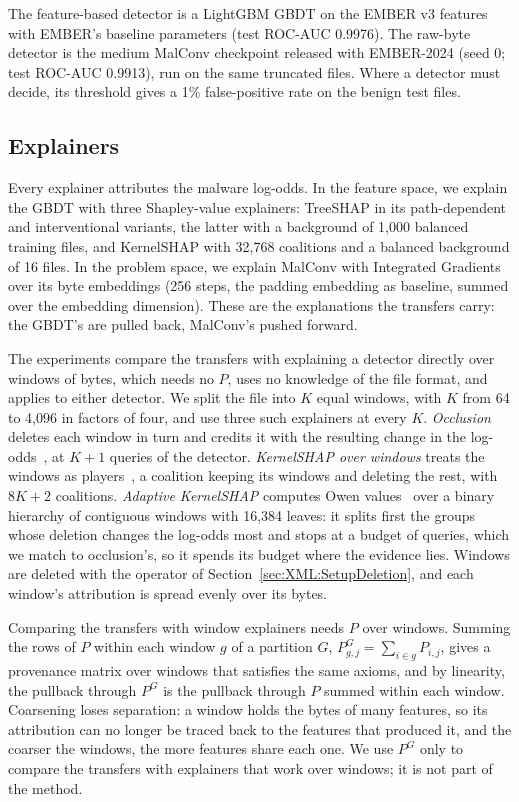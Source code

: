 The feature-based detector is a LightGBM GBDT on the EMBER v3 features with EMBER's baseline parameters (test ROC-AUC
0.9976). The raw-byte detector is the medium MalConv checkpoint released with EMBER-2024 (seed 0; test ROC-AUC 0.9913),
run on the same truncated files. Where a detector must decide, its threshold gives a 1\% false-positive rate on the
benign test files.

\subsection{Explainers}
\label{sec:XML:SetupExplainers}
\label{sec:XML:SetupWindows}

Every explainer attributes the malware log-odds. In the feature space, we explain the GBDT with three Shapley-value
explainers: TreeSHAP in its path-dependent and interventional variants, the latter with a background of 1{,}000
balanced training files, and KernelSHAP with 32{,}768 coalitions and a balanced background of 16 files. In the problem
space, we explain MalConv with Integrated Gradients over its byte embeddings (256 steps, the padding embedding as
baseline, summed over the embedding dimension). These are the explanations the transfers carry: the GBDT's are pulled
back, MalConv's pushed forward.

The experiments compare the transfers with explaining a detector directly over windows of bytes, which needs no $P$,
uses no knowledge of the file format, and applies to either detector. We split the file into $K$ equal windows, with
$K$ from 64 to 4{,}096 in factors of four, and use three such explainers at every $K$. \emph{Occlusion} deletes each
window in turn and credits it with the resulting change in the log-odds~\cite{zeiler2014visualizing}, at $K + 1$ queries
of the detector. \emph{KernelSHAP over windows} treats the windows as players~\cite{lundberg2017unified}, a coalition
keeping its windows and deleting the rest, with $8K + 2$ coalitions. \emph{Adaptive KernelSHAP} computes Owen
values~\cite{owen1977values} over a binary hierarchy of contiguous windows with 16{,}384 leaves: it splits first the
groups whose deletion changes the log-odds most and stops at a budget of queries, which we match to occlusion's, so it
spends its budget where the evidence lies. Windows are deleted with the operator of
Section~\ref{sec:XML:SetupDeletion}, and each window's attribution is spread evenly over its bytes.

Comparing the transfers with window explainers needs $P$ over windows. Summing the rows of $P$ within each window $g$
of a partition $G$, $P^G_{g,j} = \sum_{i \in g} P_{i,j}$, gives a provenance matrix over windows that satisfies the
same axioms, and by linearity, the pullback through $P^G$ is the pullback through $P$ summed within each window.
Coarsening loses separation: a window holds the bytes of many features, so its attribution can no longer be traced
back to the features that produced it, and the coarser the windows, the more features share each one. We use $P^G$
only to compare the transfers with explainers that work over windows; it is not part of the method.

